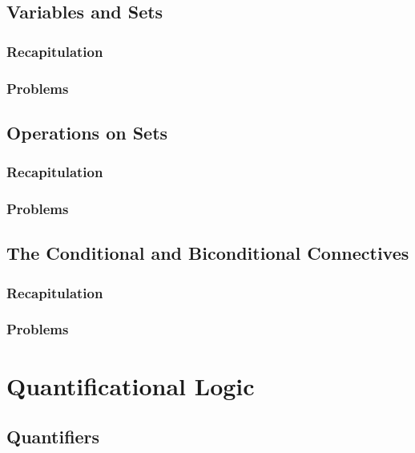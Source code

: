 \documentclass{report}
\begin{document}
    \section{Variables and Sets}
        \subsection{Recapitulation}
        
        \subsection{Problems}
        
    \section{Operations on Sets}
        \subsection{Recapitulation}
        
        \subsection{Problems}
        
    \section{The Conditional and Biconditional Connectives}
        \subsection{Recapitulation}
        
        \subsection{Problems}
        

\chapter{Quantificational Logic}
    \section{Quantifiers}
\end{document}
